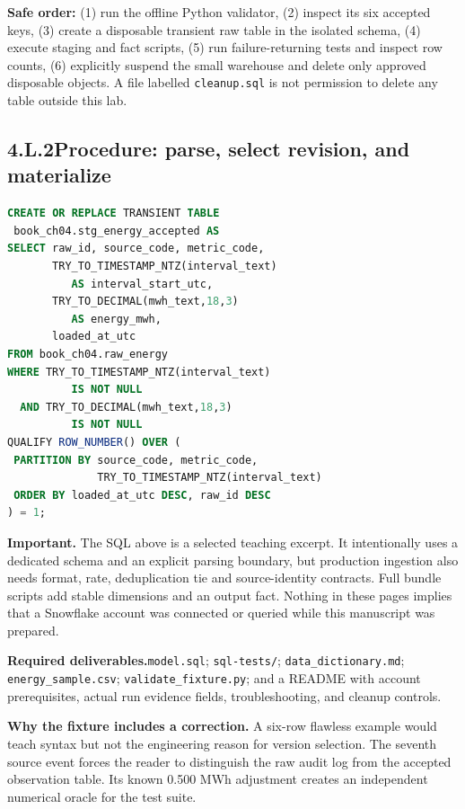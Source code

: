 \documentclass[11pt,twoside]{article}
\newcommand{\topic}[2]{\subsection*{#1\quad #2}}
\begin{document}
\textbf{Safe order:} (1) run the offline Python validator, (2) inspect its six accepted keys, (3) create a disposable transient raw table in the isolated schema, (4) execute staging and fact scripts, (5) run failure-returning tests and inspect row counts, (6) explicitly suspend the small warehouse and delete only approved disposable objects. A file labelled \texttt{cleanup.sql} is not permission to delete any table outside this lab.

\topic{4.L.2}{Procedure: parse, select revision, and materialize}
\begin{lstlisting}[language=SQL,caption={Illustrative model transformation; full script in bundle.}]
CREATE OR REPLACE TRANSIENT TABLE
 book_ch04.stg_energy_accepted AS
SELECT raw_id, source_code, metric_code,
       TRY_TO_TIMESTAMP_NTZ(interval_text)
          AS interval_start_utc,
       TRY_TO_DECIMAL(mwh_text,18,3)
          AS energy_mwh,
       loaded_at_utc
FROM book_ch04.raw_energy
WHERE TRY_TO_TIMESTAMP_NTZ(interval_text)
          IS NOT NULL
  AND TRY_TO_DECIMAL(mwh_text,18,3)
          IS NOT NULL
QUALIFY ROW_NUMBER() OVER (
 PARTITION BY source_code, metric_code,
              TRY_TO_TIMESTAMP_NTZ(interval_text)
 ORDER BY loaded_at_utc DESC, raw_id DESC
) = 1;
\end{lstlisting}

\textbf{Important.} The SQL above is a selected teaching excerpt. It intentionally uses a dedicated schema and an explicit parsing boundary, but production ingestion also needs format, rate, deduplication tie and source-identity contracts. Full bundle scripts add stable dimensions and an output fact. Nothing in these pages implies that a Snowflake account was connected or queried while this manuscript was prepared.

\begin{insight}\textbf{Required deliverables.}\quad \texttt{model.sql}; \texttt{sql-tests/}; \texttt{data\_dictionary.md}; \texttt{energy\_sample.csv}; \texttt{validate\_fixture.py}; and a README with account prerequisites, actual run evidence fields, troubleshooting, and cleanup controls.\end{insight}


\textbf{Why the fixture includes a correction.} A six-row flawless example would teach syntax but not the engineering reason for version selection. The seventh source event forces the reader to distinguish the raw audit log from the accepted observation table. Its known 0.500 MWh adjustment creates an independent numerical oracle for the test suite.
\end{document}
